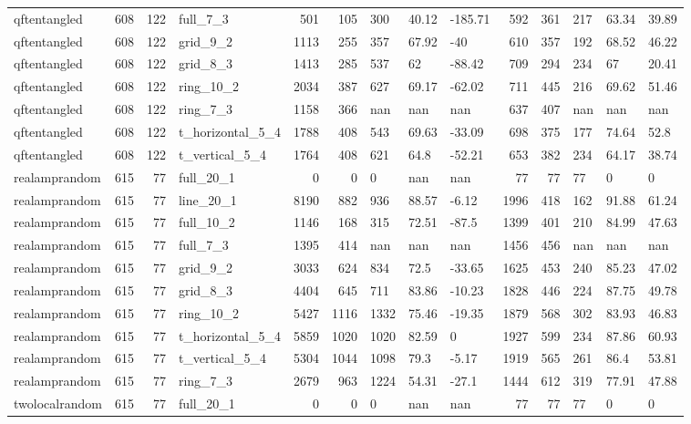 \begin{longtable}{lrrlrrlllrrlll}
qftentangled & 608 & 122 & full\_7\_3 & 501 & 105 & 300 & 40.12 & -185.71 & 592 & 361 & 217 & 63.34 & 39.89 \\
qftentangled & 608 & 122 & grid\_9\_2 & 1113 & 255 & 357 & 67.92 & -40 & 610 & 357 & 192 & 68.52 & 46.22 \\
qftentangled & 608 & 122 & grid\_8\_3 & 1413 & 285 & 537 & 62 & -88.42 & 709 & 294 & 234 & 67 & 20.41 \\
qftentangled & 608 & 122 & ring\_10\_2 & 2034 & 387 & 627 & 69.17 & -62.02 & 711 & 445 & 216 & 69.62 & 51.46 \\
qftentangled & 608 & 122 & ring\_7\_3 & 1158 & 366 & nan & nan & nan & 637 & 407 & nan & nan & nan \\
qftentangled & 608 & 122 & t\_horizontal\_5\_4 & 1788 & 408 & 543 & 69.63 & -33.09 & 698 & 375 & 177 & 74.64 & 52.8 \\
qftentangled & 608 & 122 & t\_vertical\_5\_4 & 1764 & 408 & 621 & 64.8 & -52.21 & 653 & 382 & 234 & 64.17 & 38.74 \\
realamprandom & 615 & 77 & full\_20\_1 & 0 & 0 & 0 & nan & nan & 77 & 77 & 77 & 0 & 0 \\
realamprandom & 615 & 77 & line\_20\_1 & 8190 & 882 & 936 & 88.57 & -6.12 & 1996 & 418 & 162 & 91.88 & 61.24 \\
realamprandom & 615 & 77 & full\_10\_2 & 1146 & 168 & 315 & 72.51 & -87.5 & 1399 & 401 & 210 & 84.99 & 47.63 \\
realamprandom & 615 & 77 & full\_7\_3 & 1395 & 414 & nan & nan & nan & 1456 & 456 & nan & nan & nan \\
realamprandom & 615 & 77 & grid\_9\_2 & 3033 & 624 & 834 & 72.5 & -33.65 & 1625 & 453 & 240 & 85.23 & 47.02 \\
realamprandom & 615 & 77 & grid\_8\_3 & 4404 & 645 & 711 & 83.86 & -10.23 & 1828 & 446 & 224 & 87.75 & 49.78 \\
realamprandom & 615 & 77 & ring\_10\_2 & 5427 & 1116 & 1332 & 75.46 & -19.35 & 1879 & 568 & 302 & 83.93 & 46.83 \\
realamprandom & 615 & 77 & t\_horizontal\_5\_4 & 5859 & 1020 & 1020 & 82.59 & 0 & 1927 & 599 & 234 & 87.86 & 60.93 \\
realamprandom & 615 & 77 & t\_vertical\_5\_4 & 5304 & 1044 & 1098 & 79.3 & -5.17 & 1919 & 565 & 261 & 86.4 & 53.81 \\
realamprandom & 615 & 77 & ring\_7\_3 & 2679 & 963 & 1224 & 54.31 & -27.1 & 1444 & 612 & 319 & 77.91 & 47.88 \\
twolocalrandom & 615 & 77 & full\_20\_1 & 0 & 0 & 0 & nan & nan & 77 & 77 & 77 & 0 & 0 \\

\end{longtable}
